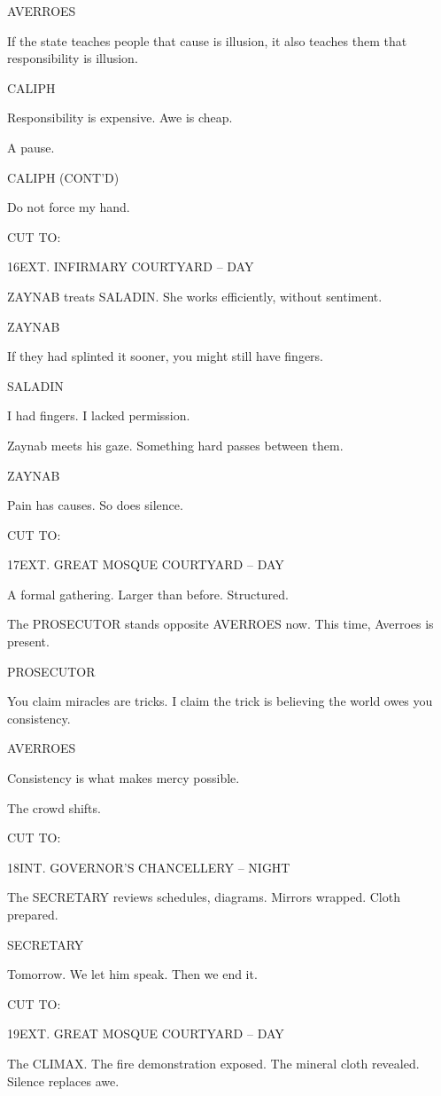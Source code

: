 \documentclass[12pt]{article}
\newlength{\charindent}
\newlength{\dialogueindent}
\newlength{\dialoguewidth}
\newlength{\transitionindent}
\newcommand{\slug}[1]{%
  \needspace{4\baselineskip}%
  \vspace{1.5em}%
  \noindent\MakeUppercase{#1}%
  \nopagebreak[4]%
  \par\vspace{0.75em}%
}
\newcommand{\action}[1]{%
  \noindent#1\par\vspace{0.75em}%
}
\newcommand{\character}[1]{%
  \needspace{3\baselineskip}%
  \par\vspace{0.5em}%
  \noindent\hspace*{\charindent}\MakeUppercase{#1}\nopagebreak[4]%
}
\newcommand{\dialogue}[1]{%
  \par\nobreak\nopagebreak[4]%
  \noindent\hspace*{\dialogueindent}%
  \begin{minipage}[t]{\dialoguewidth}
  #1
  \end{minipage}%
  \par\vspace{0.5em}%
}
\newcommand{\transition}[1]{%
  \needspace{2\baselineskip}%
  \par\vspace{1em}%
  \noindent\hspace*{\transitionindent}\MakeUppercase{#1}%
  \par%
}
\newcommand{\contd}{\textsc{(cont'd)}}
\begin{document}
\character{AVERROES}
\dialogue{If the state teaches people that cause is illusion, it also teaches them that responsibility is illusion.}

\character{CALIPH}
\dialogue{Responsibility is expensive. Awe is cheap.}

\action{A pause.}

\character{CALIPH \contd}
\dialogue{Do not force my hand.}

\transition{CUT TO:}

\slug{16\quad EXT. INFIRMARY COURTYARD -- DAY}

\action{ZAYNAB treats SALADIN. She works efficiently, without sentiment.}

\character{ZAYNAB}
\dialogue{If they had splinted it sooner, you might still have fingers.}

\character{SALADIN}
\dialogue{I had fingers. I lacked permission.}

\action{Zaynab meets his gaze. Something hard passes between them.}

\character{ZAYNAB}
\dialogue{Pain has causes. So does silence.}

\transition{CUT TO:}

\slug{17\quad EXT. GREAT MOSQUE COURTYARD -- DAY}

\action{A formal gathering. Larger than before. Structured.}

\action{The PROSECUTOR stands opposite AVERROES now. This time, Averroes is present.}

\character{PROSECUTOR}
\dialogue{You claim miracles are tricks. I claim the trick is believing the world owes you consistency.}

\character{AVERROES}
\dialogue{Consistency is what makes mercy possible.}

\action{The crowd shifts.}

\transition{CUT TO:}

\slug{18\quad INT. GOVERNOR'S CHANCELLERY -- NIGHT}

\action{The SECRETARY reviews schedules, diagrams. Mirrors wrapped. Cloth prepared.}

\character{SECRETARY}
\dialogue{Tomorrow. We let him speak. Then we end it.}

\transition{CUT TO:}

\slug{19\quad EXT. GREAT MOSQUE COURTYARD -- DAY}

\action{The CLIMAX. The fire demonstration exposed. The mineral cloth revealed. Silence replaces awe.}
\end{document}
